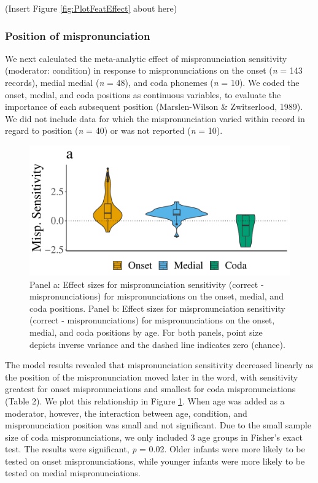 \documentclass[man, noextraspace]{apa6}
\begin{document}
(Insert Figure \ref{fig:PlotFeatEffect} about here)

\hypertarget{position-of-mispronunciation}{%
\subsubsection{Position of mispronunciation}\label{position-of-mispronunciation}}

We next calculated the meta-analytic effect of mispronunciation sensitivity (moderator: condition) in response to mispronunciations on the onset (\emph{n} = 143 records), medial medial (\emph{n} = 48), and coda phonemes (\emph{n} = 10). We coded the onset, medial, and coda positions as continuous variables, to evaluate the importance of each subsequent position (Marslen-Wilson \& Zwitserlood, 1989). We did not include data for which the mispronunciation varied within record in regard to position (\emph{n} = 40) or was not reported (\emph{n} = 10).

\begin{figure}
\centering
\includegraphics{VonHolzenBergmann_MPMetaAnalysis_files/figure-latex/PlotMispPosit-1.pdf}
\caption{\label{fig:PlotMispPosit}Panel a: Effect sizes for mispronunciation sensitivity (correct - mispronunciations) for mispronunciations on the onset, medial, and coda positions. Panel b: Effect sizes for mispronunciation sensitivity (correct - mispronunciations) for mispronunciations on the onset, medial, and coda positions by age. For both panels, point size depicts inverse variance and the dashed line indicates zero (chance).}
\end{figure}

The model results revealed that mispronunciation sensitivity decreased linearly as the position of the mispronunciation moved later in the word, with sensitivity greatest for onset mispronunciations and smallest for coda mispronunciations (Table 2). We plot this relationship in Figure \ref{fig:PlotMispPosit}. When age was added as a moderator, however, the interaction between age, condition, and mispronunciation position was small and not significant. Due to the small sample size of coda mispronunciations, we only included 3 age groups in Fisher's exact test. The results were significant, \emph{p} = 0.02. Older infants were more likely to be tested on onset mispronunciations, while younger infants were more likely to be tested on medial mispronunciations.
\end{document}
